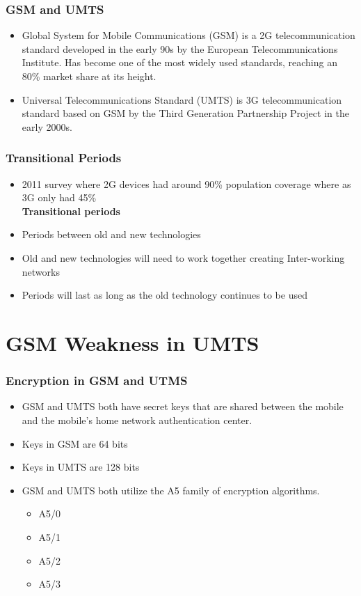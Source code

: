 \documentclass{beamer}
\begin{document}
		\begin{frame}
		\frametitle{GSM and UMTS}
		\begin{itemize}
		\item Global System for Mobile Communications (GSM) is a 2G telecommunication standard developed in the early 90s by the European Telecommunications Institute. Has become one of the most widely used standards, reaching an 80\% market share at its height.
					
		
		\item Universal Telecommunications Standard (UMTS) is 3G telecommunication standard based on GSM by the Third Generation Partnership Project in the early 2000s.   
		\end{itemize}
	\end{frame}
	
	\begin{frame}
	\frametitle{Transitional Periods}
	
		
		

		\begin{itemize}
		\item 2011 survey where 2G devices had around 90\% population coverage where as 3G only had 45\%\\
	\vspace{.25cm}
		\textbf{Transitional periods}\\
			\item Periods between old and new technologies 
			\item Old and new technologies will need to work together creating Inter-working networks
			\item Periods will last as long as the old technology continues to be used 
		\end{itemize}
\end{frame}

	
\section{GSM Weakness in UMTS}

	

	\begin{frame}
	\frametitle{Encryption in GSM and UTMS}
	\begin{itemize}
	
	
		\item GSM and UMTS both have secret keys that are shared between the mobile and the mobile's home network authentication center.
		\item Keys in GSM are 64 bits
		\item Keys in UMTS are 128 bits
		
		\item GSM and UMTS both utilize the A5 family of encryption algorithms. 
		 \begin{itemize}
			\item A5/0 
			\item A5/1
			\item A5/2
			\item A5/3 
		\end{itemize}
		\end{itemize}
	\end{frame}
	
\end{document}
